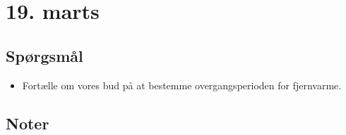 \pagebreak

\section{19. marts}

\subsection{Spørgsmål}
\begin{itemize}
    \item Fortælle om vores bud på at bestemme overgangsperioden for fjernvarme.
\end{itemize}

\subsection{Noter}
